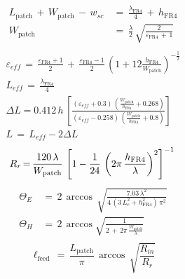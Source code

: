 \documentclass[10 pt,a4paper,twocolumn]{article}
\begin{document}
{\begin{equation}
\begin{aligned}L_{\operatorname{patch}}\,+\,W_{\operatorname{patch}}\,-\,w_{sc}\,&{=}\,\frac{\lambda_{\operatorname{FR4}}}{4}\,+\,h_{\operatorname{FR4}}\\
	W_{\operatorname{patch}}\,&{=}\,\frac{\lambda}{2}\,\sqrt{\frac{2}{\varepsilon_{\operatorname{FR4}}\,+\,1}}\\
\end{aligned}
\label{eq:patch size}
\end{equation}
\begin{equation}
\begin{aligned}
	\varepsilon_{eff}\,{=}\,\frac{\varepsilon_{\operatorname{FR4}}+1}{2}\,+\,\frac{\varepsilon_{\operatorname{FR4}}-1}{2}\,\left(1+12\frac{h_{\operatorname{FR4}}}{W_{\operatorname{patch}}}\right)^{-\frac{1}{2}}\\
	L_{eff}\,{=}\,\frac{\lambda_{\operatorname{FR4}}}{4}\\
	\Delta L{=}0.412\,h\,\left[\frac{(\varepsilon_{eff}+0.3)\,\left(\frac{W_{\operatorname{patch}}}{h_{\operatorname{FR4}}}+0.268\right)}{(\varepsilon_{eff}-0.258)\,\left(\frac{W_{\operatorname{patch}}}{h_{\operatorname{FR4}}}+0.8\right)}\right]\\
	L\,=\,L_{eff}-2\Delta L
\end{aligned}
\label{eq:patch effective}
\end{equation}
\begin{equation}
R_r\,{=}\,\frac{120\,\lambda}{W_{\operatorname{patch}}}\,\left[1-\frac{1}{24}\,\left(2\pi\,\frac{h_{\operatorname{FR4}}}{\lambda}\right)^{2}\right]^{-1}\\
\label{eq:radiation resistance}
\end{equation}
\begin{equation}
\begin{aligned}
	\Theta_E\,&{=}\,2\,\arccos\,\sqrt{\frac{7.03\,\lambda^2}{4\,(3\,L_e^2+h_{\operatorname{FR4}}^2)\,\pi^2}}\\
	\Theta_H\,&{=}\,2\,\arccos\sqrt{\frac{1}{2\,+\,2\pi\,\frac{W_{\operatorname{patch}}}{\lambda}}}\\
\end{aligned}
\label{eq:beamwidth EH cuts}
\end{equation}
\begin{equation}
\ell_{\operatorname{feed}}\,{=}\,\frac{L_{\operatorname{patch}}}{\pi}\,\arccos\,\sqrt{\frac{R_{in}}{R_r}}
\label{eq:feed length coordinate}
\end{equation}

}
\end{document}
